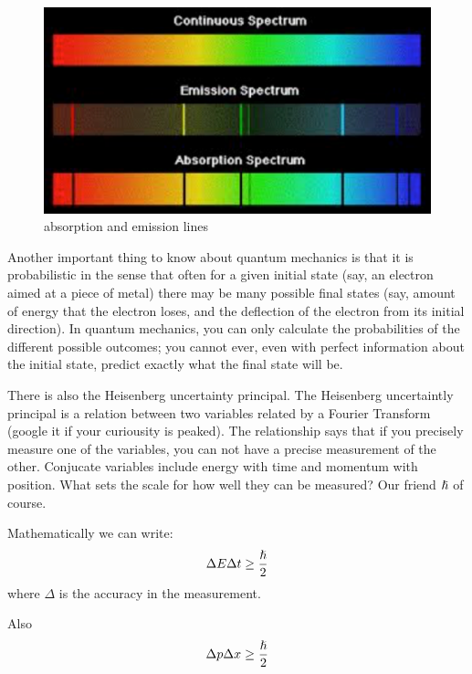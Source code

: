 \begin{figure}[h]
\centering\includegraphics[scale=0.5]{./ElementaryParticles/Pictures/fig6.pdf}
\caption{absorption and emission lines}
\label{fig:light}
\end{figure}


Another important thing to know about quantum mechanics is that it is probabilistic in the sense that often for a given initial state (say, an electron aimed at a piece of metal) there may be many possible final states (say, amount of energy that the electron loses, and the deflection of the electron from its initial direction).  In quantum mechanics, you can only calculate the probabilities of the different possible outcomes; you cannot ever, even with perfect information about the initial state, predict exactly what the final state will be.

There is also the Heisenberg uncertainty principal.  The Heisenberg uncertaintly principal is a relation between two variables related by a Fourier Transform (google it if your curiousity is peaked).  The relationship says that if you precisely measure one of the variables, you can not have a precise measurement of the other.   Conjucate variables include energy with time and momentum with position.  What sets the scale for how well they can be measured?  Our friend ${\rm \hslash}$ of course.

Mathematically we can write:
\begin{equation}
\Delta E \Delta t \ge {\hslash \over 2}
\end{equation} 
where $\Delta$ is the accuracy in the measurement.

Also
\begin{equation}
\Delta p \Delta x \ge {\hslash \over 2}
\end{equation}
 
